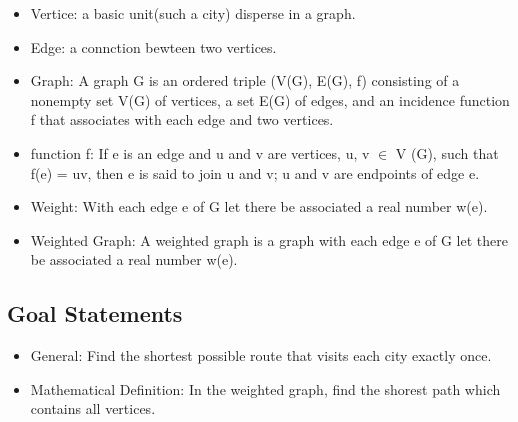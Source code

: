 \documentclass[12pt]{article}
\begin{document}
\begin{itemize}
    \item Vertice: a basic unit(such a city) disperse in a graph.
    \item Edge: a connction bewteen two vertices.
    \item Graph: A graph G is an ordered triple (V(G), E(G), f) consisting of a nonempty set V(G) of vertices, 
    a set E(G) of edges, and an incidence function f that associates with each edge and two vertices.
    \item function f: If e is an edge and u and v are vertices, 
    u, v $\in$  V (G), such that f(e) = uv, then e is said to join u and v; u and v are endpoints of edge e.     
    \item Weight: With each edge e of G let there be associated a real number w(e).
    \item Weighted Graph: A weighted graph is a graph with each edge e of G let there be associated a real number w(e).
\end{itemize}


\subsection{Goal Statements}
\begin{itemize}
    \item General: Find the shortest possible route that visits each city exactly once.
    \item Mathematical Definition: In the weighted graph, find the shorest path which contains all vertices.
\end{itemize}
\end{document}
